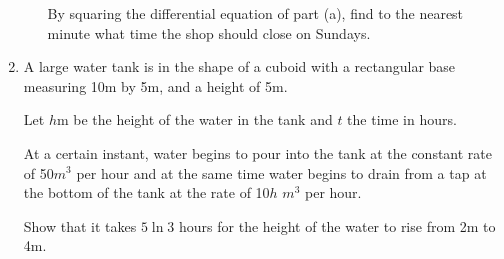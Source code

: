 \documentclass[../main.tex]{subfiles}
\begin{document}
\begin{enumerate}[itemsep=0.7cm]
\begin{enumerate}[itemsep=0.5cm]
        By squaring the differential equation of part (a), find to the nearest minute what time the shop should close on Sundays.
    \end{enumerate}

    \item 
    A large water tank is in the shape of a cuboid with a rectangular base measuring 10m by 5m, and a height of 5m.

    Let $h$m be the height of the water in the tank and $t$ the time in hours.
    
    At a certain instant, water begins to pour into the tank at the constant rate of 50$m^3$ per hour and at the same time water begins to drain from a tap at the bottom of the tank at the rate of 10$h$ $m^3$ per hour.
    
    Show that it takes $5\ln{3}$ hours for the height of the water to rise from 2m to 4m.


\end{enumerate}
\end{document}
